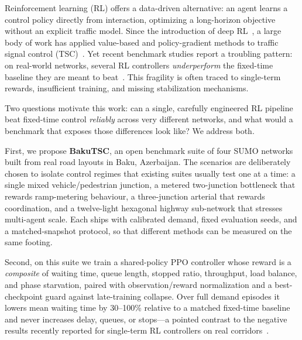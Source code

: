 \documentclass[conference,a4paper]{IEEEtran}
\begin{document}
Reinforcement learning (RL) offers a data-driven alternative: an agent learns a
control policy directly from interaction, optimizing a long-horizon objective
without an explicit traffic model. Since the
introduction of deep RL~\cite{mnih2015human}, a large body of work has applied
value-based and policy-gradient methods to traffic signal control
(TSC)~\cite{genders2016using,wei2018intellilight,haydari2020deep}. Yet recent
benchmark studies report a troubling pattern: on real-world networks, several
RL controllers \emph{underperform} the fixed-time baseline they are meant to
beat~\cite{nguyen2025robustness}. This fragility is often
traced to single-term rewards, insufficient training, and missing
stabilization mechanisms.

Two questions motivate this work: can a single, carefully engineered RL pipeline
beat fixed-time control \emph{reliably} across very different networks, and what
would a benchmark that exposes those differences look like? We address both.

First, we propose \textbf{BakuTSC}, an open benchmark suite of four SUMO networks
built from real road layouts in Baku, Azerbaijan. The scenarios are deliberately
chosen to isolate control regimes that existing suites usually test one at a
time: a single mixed vehicle/pedestrian junction, a metered two-junction
bottleneck that rewards ramp-metering behaviour, a three-junction arterial that
rewards coordination, and a twelve-light hexagonal highway sub-network that
stresses multi-agent scale. Each ships with calibrated demand, fixed evaluation
seeds, and a matched-snapshot protocol, so that different methods can be measured
on the same footing.

Second, on this suite we train a shared-policy PPO controller whose reward is a
\emph{composite} of waiting time, queue length, stopped ratio, throughput, load
balance, and phase starvation, paired with observation/reward normalization and a
best-checkpoint guard against late-training collapse. Over full demand episodes
it lowers mean waiting time by 30--100\% relative to a matched fixed-time
baseline and never increases delay, queues, or stops---a pointed contrast to the
negative results recently reported for single-term RL controllers on real
corridors~\cite{nguyen2025robustness}.

\end{document}
